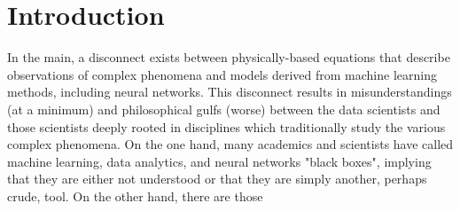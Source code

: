 \section{Introduction}\label{introduction}

In the main, a disconnect exists between physically-based equations that describe observations of complex phenomena and models derived from machine learning methods, including neural networks. This disconnect results in misunderstandings (at a minimum) and philosophical gulfs (worse) between the data scientists and those scientists deeply rooted in disciplines which traditionally study the various complex phenomena.  On the one hand, many academics and scientists have called machine learning, data analytics, and neural networks "black boxes", implying that they are either not understood or that they are simply another, perhaps crude, tool.  On the other hand, there are those 